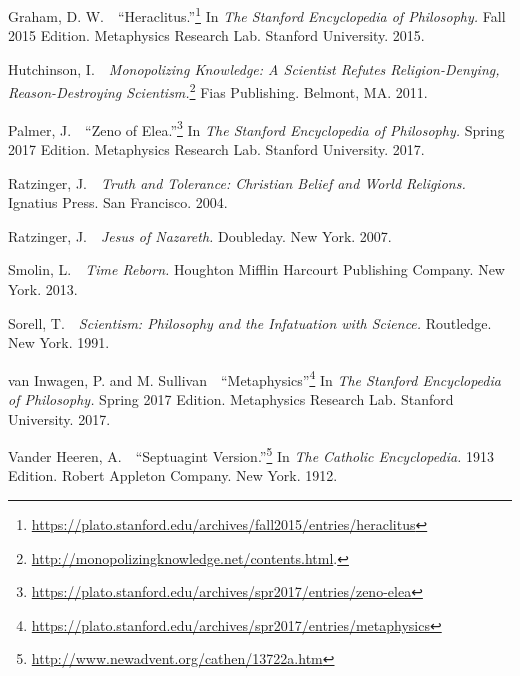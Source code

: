 \documentclass[twocolumn]{article}
\begin{document}
\begin{thebibliography}{}
\begin{small}
      Graham, D. W.\ \ ``Heraclitus.''\footnote{%
         \url{https://plato.stanford.edu/archives/fall2015/entries/heraclitus}
      }
      In {\it The Stanford Encyclopedia of Philosophy.}  Fall 2015 Edition.
      Metaphysics Research Lab.  Stanford University.  2015.

      Hutchinson, I.\ \ {\it Monopolizing Knowledge: A Scientist Refutes
      Religion-Denying, Reason-Destroying Scientism.}\footnote{%
         \url{http://monopolizingknowledge.net/contents.html}.%
      }
      Fias Publishing.  Belmont, MA.  2011.

      Palmer, J.\ \ ``Zeno of Elea.''\footnote{%
         \url{https://plato.stanford.edu/archives/spr2017/entries/zeno-elea}%
      }
      In {\it The Stanford Encyclopedia of Philosophy.}  Spring 2017 Edition.
      Metaphysics Research Lab.  Stanford University.  2017.

      Ratzinger, J.\ \ {\it Truth and Tolerance: Christian Belief and World
      Religions.}  Ignatius Press.  San Francisco.  2004.

      Ratzinger, J.\ \ {\it Jesus of Nazareth.}  Doubleday.  New York.  2007.

      Smolin, L.\ \ {\it Time Reborn.}  Houghton Mifflin Harcourt Publishing
      Company.  New York.  2013.

      Sorell, T.\ \ {\it Scientism: Philosophy and the Infatuation with
      Science.}  Routledge.  New York.  1991.

      van Inwagen, P. and M. Sullivan\ \ ``Metaphysics''\footnote{%
         \url{https://plato.stanford.edu/archives/spr2017/entries/metaphysics}%
      }
      In {\it The Stanford Encyclopedia of Philosophy.}  Spring 2017 Edition.
      Metaphysics Research Lab.  Stanford University.  2017.

      Vander Heeren, A.\ \ ``Septuagint Version.''\footnote{%
         \url{http://www.newadvent.org/cathen/13722a.htm}%
      }
      In {\it The Catholic Encyclopedia.}  1913 Edition.  Robert Appleton
      Company.  New York.  1912.

   \end{small}

\end{thebibliography}


\end{document}

